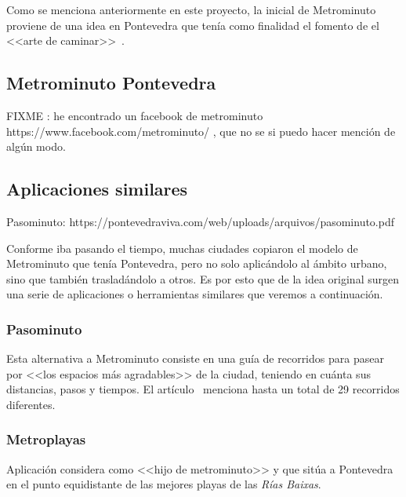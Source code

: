 
Como se menciona anteriormente en este proyecto, la inicial de Metrominuto proviene de una idea en Pontevedra que tenía como finalidad el fomento de el <<arte de caminar>>~\cite{wiki:metrominuto-pontevedra}.



\subsection{Metrominuto Pontevedra}
FIXME : he encontrado un facebook de metrominuto https://www.facebook.com/metrominuto/  , que no se si puedo hacer mención de algún modo.


\subsection{Aplicaciones similares}
Pasominuto: https://pontevedraviva.com/web/uploads/arquivos/pasominuto.pdf

Conforme iba pasando el tiempo, muchas ciudades copiaron el modelo de Metrominuto que tenía Pontevedra, pero no solo aplicándolo al ámbito urbano, sino que también trasladándolo a otros. Es por esto que de la idea original surgen una serie de aplicaciones o herramientas similares que veremos a continuación.

\subsubsection{Pasominuto}
Esta alternativa a Metrominuto consiste en una guía de recorridos para pasear por <<los espacios más agradables>> de la ciudad, teniendo en cuánta sus distancias, pasos y tiempos. El artículo~\cite{art:pasominuto} menciona hasta un total de 29 recorridos diferentes.

\subsubsection{Metroplayas}
Aplicación considera como <<hijo de metrominuto>> y que sitúa a Pontevedra en el punto equidistante de las mejores playas de las \textit{Rías Baixas}.
